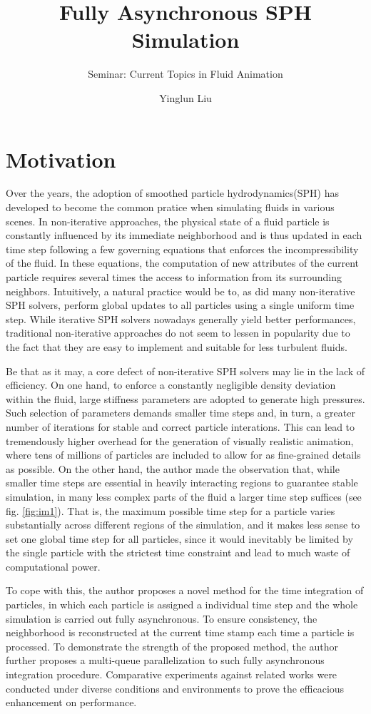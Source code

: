 \documentclass[
	11pt, 
	DIV10,
	ngerman,
	a4paper, 
	oneside, 
	headings=normal, 
	captions=tableheading,
	final, 
	numbers=noenddot
]{scrartcl}
\title{Fully Asynchronous SPH Simulation}
\subtitle{\vspace{0.5cm}Seminar: Current Topics in Fluid Animation}
\author{Yinglun Liu}
\begin{document}
\maketitle


\section{Motivation}

Over the years, the adoption of smoothed particle hydrodynamics(SPH) has developed to become the common pratice when simulating fluids in various scenes. In non-iterative approaches, the physical state of a fluid particle is constantly influenced by its immediate neighborhood and is thus updated in each time step following a few governing equations that enforces the incompressibility of the fluid. In these equations, the computation of new attributes of the current particle requires several times the access to information from its surrounding neighbors. Intuitively, a natural practice would be to, as did many non-iterative SPH solvers, perform global updates to all particles using a single uniform time step. While iterative SPH solvers nowadays generally yield better performances, traditional non-iterative approaches do not seem to lessen in popularity due to the fact that they are easy to implement and suitable for less turbulent fluids.
\par
Be that as it may, a core defect of non-iterative SPH solvers may lie in the lack of efficiency. On one hand, to enforce a constantly negligible density deviation within the fluid, large stiffness parameters are adopted to generate high pressures. Such selection of parameters demands smaller time steps and, in turn, a greater number of iterations for stable and correct particle interations. This can lead to tremendously higher overhead for the generation of visually realistic animation, where tens of millions of particles are included to allow for as fine-grained details as possible. On the other hand, the author made the observation that, while smaller time steps are essential in heavily interacting regions to guarantee stable simulation, in many less complex parts of the fluid a larger time step suffices (see fig. \ref{fig:im1}). That is, the maximum possible time step for a particle varies substantially across different regions of the simulation, and it makes less sense to set one global time step for all particles, since it would inevitably be limited by the single particle with the strictest time constraint and lead to much waste of computational power.
\par
To cope with this, the author proposes a novel method for the time integration of particles, in which each particle is assigned a individual time step and the whole simulation is carried out fully asynchronous. To ensure consistency, the neighborhood is reconstructed at the current time stamp each time a particle is processed. To demonstrate the strength of the proposed method, the author further proposes a multi-queue parallelization to such fully asynchronous integration procedure. Comparative experiments against related works were conducted under diverse conditions and environments to prove the efficacious enhancement on performance.
\end{document}
